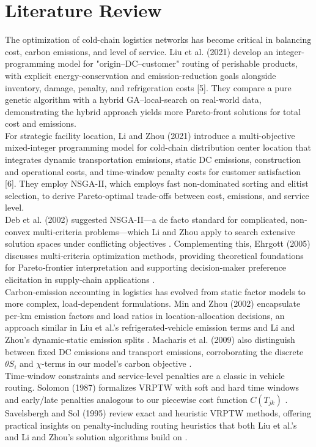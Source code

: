 \documentclass[conference]{IEEEtran}
\begin{document}
\bigskip

\section{Literature Review}

The optimization of cold-chain logistics networks has become critical in balancing cost, carbon emissions, and level of service. Liu et al. (2021) develop an integer-programming model for "origin–DC–customer" routing of perishable products, with explicit energy-conservation and emission-reduction goals alongside inventory, damage, penalty, and refrigeration costs [5]. They compare a pure genetic algorithm with a hybrid GA–local-search on real-world data, demonstrating the hybrid approach yields more Pareto-front solutions for total cost and emissions.\\
For strategic facility location, Li and Zhou (2021) introduce a multi-objective mixed-integer programming model for cold-chain distribution center location that integrates dynamic transportation emissions, static DC emissions, construction and operational costs, and time-window penalty costs for customer satisfaction [6]. They employ NSGA-II, which employs fast non-dominated sorting and elitist selection, to derive Pareto-optimal trade-offs between cost, emissions, and service level.\\
Deb et al. (2002) suggested NSGA-II—a de facto standard for complicated, non‐convex multi‐criteria problems—which Li and Zhou apply to search extensive solution spaces under conflicting objectives \cite{Deb2002}. Complementing this, Ehrgott (2005) discusses multi‐criteria optimization methods, providing theoretical foundations for Pareto‐frontier interpretation and supporting decision‐maker preference elicitation in supply‐chain applications \cite{Ehrgott2005}.\\
Carbon‐emission accounting in logistics has evolved from static factor models to more complex, load‐dependent formulations. Min and Zhou (2002) encapsulate per‐km emission factors and load ratios in location‐allocation decisions, an approach similar in Liu et al.'s refrigerated‐vehicle emission terms and Li and Zhou's dynamic‐static emission splits \cite{Min2002}. Macharis et al. (2009) also distinguish between fixed DC emissions and transport emissions, corroborating the discrete $\theta S_i$ and $\chi$-terms in our model's carbon objective \cite{Macharis2009}.\\
Time‐window constraints and service‐level penalties are a classic in vehicle routing. Solomon (1987) formalizes VRPTW with soft and hard time windows and early/late penalties analogous to our piecewise cost function $C(T_{jk})$ \cite{Solomon1987}. Savelsbergh and Sol (1995) review exact and heuristic VRPTW methods, offering practical insights on penalty-including routing heuristics that both Liu et al.'s and Li and Zhou's solution algorithms build on \cite{Savelsbergh1995}.\\
\end{document}
